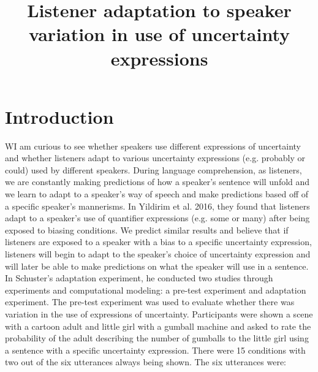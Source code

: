\documentclass[lucida,biblatex]{sp} %
\title{Listener adaptation to speaker variation in use of uncertainty expressions}
\author{%
  \spauthor{Sebastian Schuster and Judith Degen\\ \today}
}
\begin{document}

\maketitle





\section{Introduction}

WI am curious to see whether speakers use different expressions of uncertainty and whether listeners adapt to various uncertainty expressions (e.g. probably or could) used by different speakers. During language comprehension, as listeners, we are constantly making predictions of how a speaker’s sentence will unfold and we learn to adapt to a speaker’s way of speech and make predictions based off of a specific speaker’s mannerisms. In Yildirim et al. 2016, they found that listeners adapt to a speaker’s use of quantifier expressions (e.g. some or many) after being exposed to biasing conditions. We predict similar results and believe that if listeners are exposed to a speaker with a bias to a specific uncertainty expression, listeners will begin to adapt to the speaker’s choice of uncertainty expression and will later be able to make predictions on what the speaker will use in a sentence.
In Schuster’s adaptation experiment, he conducted two studies through experiments and computational modeling: a pre-test experiment and adaptation experiment. The pre-test experiment was used to evaluate whether there was variation in the use of expressions of uncertainty. Participants were shown a scene with a cartoon adult and little girl with a gumball machine and asked to rate the probability of the adult describing the number of gumballs to the little girl using a sentence with a specific uncertainty expression. There were 15 conditions with two out of the six utterances always being shown. The six utterances were: 
\end{document}
